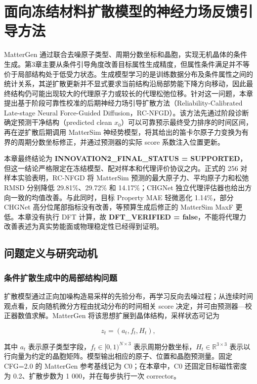 \chapter{面向冻结材料扩散模型的神经力场反馈引导方法}

MatterGen 通过联合去噪原子类型、周期分数坐标和晶胞，实现无机晶体的条件生成\citep{zeni2025}。第3章主要从条件引导角度改善目标属性生成精度，但属性条件满足并不等价于局部结构处于低受力状态。生成模型学习的是训练数据分布及条件属性之间的统计关系，其逆扩散更新并不显式要求当前结构沿局部势能下降方向移动，因此最终结构仍可能出现较大的代理原子力或较长的代理松弛位移。针对这一问题，本章提出基于阶段可靠性校准的后期神经力场引导扩散方法（Reliability-Calibrated Late-stage Neural Force-Guided Diffusion，RC-NFGD）。该方法先通过阶段诊断确定预测干净结构（predicted clean \(x_0\)）可以可靠预示最终受力排序的时间区间，再在逆扩散后期调用 Matter\allowbreak Sim 神经势模型，将其给出的笛卡尔原子力变换为有界的周期分数坐标修正，并通过预测器的实际 score 系数注入位置更新。

本章最终结论为 \textbf{INNOVATION2\_FINAL\_STATUS = SUP\allowbreak PORTED}，但这一结论严格限定在冻结模型、配对样本和代理评价协议之内。正式的 256 对样本实验表明，RC-NFGD 将 Matter\allowbreak Sim 预测的最大原子力、平均原子力和松弛 RMSD 分别降低 29.81\%、29.72\% 和 14.17\%；CHGNet 独立代理评估器也给出方向一致的均值改善。与此同时，目标 Property MAE 轻微恶化 1.14\%，部分 CHGNet 高分位尾部指标没有改善，等预算生成后修正的 Matter\allowbreak Sim MaxF 更低。本章没有执行 DFT 计算，故 \textbf{DFT\_VERIFIED = false}，不能将代理力改善表述为真实势能面或物理稳定性已经得到证明。

\section{问题定义与研究动机}

\subsection{条件扩散生成中的局部结构问题}

扩散模型通过正向加噪构造易采样的先验分布，再学习反向去噪过程\citep{ho2020}；从连续时间观点看，反向随机微分方程由扰动分布的时间相关 score 决定，并可由预测器---校正器数值求解\citep{song2021}。MatterGen 将该思想扩展到晶体结构，采样状态可记为

\[
z_t=(a_t,f_t,H_t),
\]

其中 \(a_t\) 表示原子类型字段，\(f_t\in[0,1)^{N\times3}\) 表示周期分数坐标，\(H_t\in\mathbb{R}^{3\times3}\) 表示以行向量为约定的晶胞矩阵。模型输出相应的原子、位置和晶胞预测量。固定 CFG=2.0 的 MatterGen 参考基线记为 C0；在本章中，C0 还固定目标磁性密度为 0.2、扩散步数为 1 000，并在每步执行一次 corrector。

